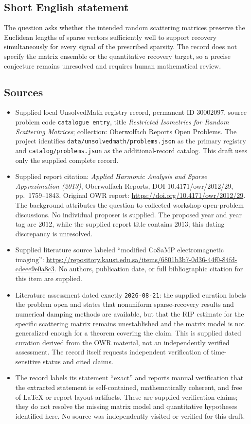 \documentclass[11pt]{article}
\begin{document}
\subsection{Short English statement}
The question asks whether the intended random scattering matrices preserve the Euclidean lengths of sparse vectors sufficiently well to support recovery simultaneously for every signal of the prescribed sparsity. The record does not specify the matrix ensemble or the quantitative recovery target, so a precise conjecture remains unresolved and requires human mathematical review.
\subsection{Sources}
\begin{itemize}
\item Supplied local UnsolvedMath registry record, permanent ID \(30002097\), source problem code \texttt{catalogue entry}, title \emph{Restricted Isometries for Random Scattering Matrices}; collection: Oberwolfach Reports Open Problems. The project identifies \texttt{data/unsolvedmath/problems.json} as the primary registry and \texttt{catalog/problems.json} as the additional-record catalog. This draft uses only the supplied complete record.
\item Supplied report citation: \emph{Applied Harmonic Analysis and Sparse Approximation (2013)}, Oberwolfach Reports, DOI 10.4171/owr/2012/29, pp.\ 1759--1843. Original OWR report: \url{https://doi.org/10.4171/owr/2012/29}. The background attributes the question to collected workshop open-problem discussions. No individual proposer is supplied. The proposed year and year tag are 2012, while the supplied report title contains 2013; this dating discrepancy is unresolved.
\item Supplied literature source labeled ``modified CoSaMP electromagnetic imaging'': \url{https://repository.kaust.edu.sa/items/6801b3b7-0d36-44f0-84fd-cdeee9e0a8c3}. No authors, publication date, or full bibliographic citation for this item are supplied.
\item Literature assessment dated exactly \texttt{2026-08-21}: the supplied curation labels the problem open and states that nonuniform sparse-recovery results and numerical damping methods are available, but that the RIP estimate for the specific scattering matrix remains unestablished and the matrix model is not generalized enough for a theorem covering the claim. This is supplied dated curation derived from the OWR material, not an independently verified assessment. The record itself requests independent verification of time-sensitive status and cited claims.
\item The record labels its statement ``exact'' and reports manual verification that the extracted statement is self-contained, mathematically coherent, and free of LaTeX or report-layout artifacts. These are supplied verification claims; they do not resolve the missing matrix model and quantitative hypotheses identified here. No source was independently visited or verified for this draft.
\end{itemize}
\end{document}
